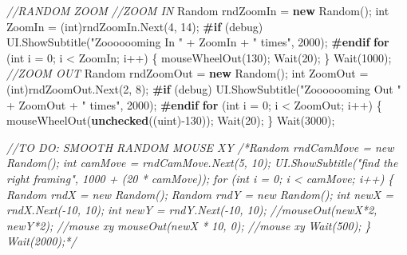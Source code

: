 \documentclass[
  openany]{book}
\newenvironment{Shaded}{\begin{snugshade}}{\end{snugshade}}
\newcommand{\CommentTok}[1]{\textcolor[rgb]{0.56,0.35,0.01}{\textit{#1}}}
\newcommand{\DataTypeTok}[1]{\textcolor[rgb]{0.13,0.29,0.53}{#1}}
\newcommand{\DecValTok}[1]{\textcolor[rgb]{0.00,0.00,0.81}{#1}}
\newcommand{\FunctionTok}[1]{\textcolor[rgb]{0.00,0.00,0.00}{#1}}
\newcommand{\KeywordTok}[1]{\textcolor[rgb]{0.13,0.29,0.53}{\textbf{#1}}}
\newcommand{\NormalTok}[1]{#1}
\newcommand{\StringTok}[1]{\textcolor[rgb]{0.31,0.60,0.02}{#1}}
\begin{document}
\begin{Shaded}
\begin{Highlighting}[]
                    \CommentTok{//RANDOM ZOOM}
                    \CommentTok{//ZOOM IN}
\NormalTok{                    Random rndZoomIn = }\KeywordTok{new} \FunctionTok{Random}\NormalTok{();}
                    \DataTypeTok{int}\NormalTok{ ZoomIn = (}\DataTypeTok{int}\NormalTok{)rndZoomIn.}\FunctionTok{Next}\NormalTok{(}\DecValTok{4}\NormalTok{, }\DecValTok{14}\NormalTok{);}
\KeywordTok{#if}\NormalTok{ (debug)}
\NormalTok{                    UI.}\FunctionTok{ShowSubtitle}\NormalTok{(}\StringTok{"Zooooooming In "}\NormalTok{ + ZoomIn + }\StringTok{" times"}\NormalTok{, }\DecValTok{2000}\NormalTok{);}
\KeywordTok{#endif}
                    \KeywordTok{for}\NormalTok{ (}\DataTypeTok{int}\NormalTok{ i = }\DecValTok{0}\NormalTok{; i < ZoomIn; i++)}
\NormalTok{                    \{}
                        \FunctionTok{mouseWheelOut}\NormalTok{(}\DecValTok{130}\NormalTok{);}
                        \FunctionTok{Wait}\NormalTok{(}\DecValTok{20}\NormalTok{);}
\NormalTok{                    \}}
                    \FunctionTok{Wait}\NormalTok{(}\DecValTok{1000}\NormalTok{);}
                    \CommentTok{//ZOOM OUT}
\NormalTok{                    Random rndZoomOut = }\KeywordTok{new} \FunctionTok{Random}\NormalTok{();}
                    \DataTypeTok{int}\NormalTok{ ZoomOut = (}\DataTypeTok{int}\NormalTok{)rndZoomOut.}\FunctionTok{Next}\NormalTok{(}\DecValTok{2}\NormalTok{, }\DecValTok{8}\NormalTok{);}
\KeywordTok{#if}\NormalTok{ (debug)}
\NormalTok{                    UI.}\FunctionTok{ShowSubtitle}\NormalTok{(}\StringTok{"Zooooooming Out "}\NormalTok{ + ZoomOut + }\StringTok{" times"}\NormalTok{, }\DecValTok{2000}\NormalTok{);}
\KeywordTok{#endif}
                    \KeywordTok{for}\NormalTok{ (}\DataTypeTok{int}\NormalTok{ i = }\DecValTok{0}\NormalTok{; i < ZoomOut; i++)}
\NormalTok{                    \{}
                        \FunctionTok{mouseWheelOut}\NormalTok{(}\KeywordTok{unchecked}\NormalTok{((}\DataTypeTok{uint}\NormalTok{)-}\DecValTok{130}\NormalTok{));}
                        \FunctionTok{Wait}\NormalTok{(}\DecValTok{20}\NormalTok{);}
\NormalTok{                    \}}
                    \FunctionTok{Wait}\NormalTok{(}\DecValTok{3000}\NormalTok{);}

                    \CommentTok{//TO DO: SMOOTH RANDOM MOUSE XY}
                    \CommentTok{/*Random rndCamMove = new Random();}
\CommentTok{                    int camMove = rndCamMove.Next(5, 10);}
\CommentTok{                    UI.ShowSubtitle("find the right framing", 1000 + (20 * camMove));}
\CommentTok{                    for (int i = 0; i < camMove; i++)}
\CommentTok{                    \{}
\CommentTok{                        Random rndX = new Random();}
\CommentTok{                        Random rndY = new Random();}
\CommentTok{                        int newX = rndX.Next(-10, 10);}
\CommentTok{                        int newY = rndY.Next(-10, 10);}
\CommentTok{                        //mouseOut(newX*2, newY*2); //mouse xy}
\CommentTok{                        mouseOut(newX * 10, 0); //mouse xy}
\CommentTok{                        Wait(500);}
\CommentTok{                    \}}
\CommentTok{                    Wait(2000);*/}


\end{Highlighting}
\end{Shaded}
\end{document}
